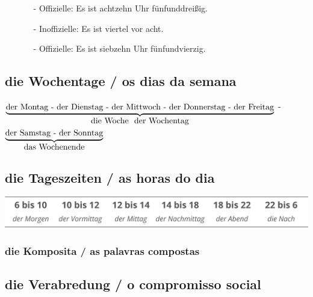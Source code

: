 \begin{multicols}{2}
\begin{itemize}[topsep=0pt,itemsep=4pt,parsep=0pt]
\begin{itemize}
                            \item[-] Offizielle: {\color{saffron}Es ist achtzehn Uhr fünfunddreißig.}
                        \end{itemize}
                    \item[] {\color{deep_carmine}}
                        \begin{itemize}
                            \item[-] Inoffizielle: {\color{deep_carmine}Es ist  viertel vor acht.}
                            \item[-] Offizielle: {\color{deep_carmine}Es ist siebzehn Uhr fünfundvierzig.}
                        \end{itemize}
                \end{itemize}
            \vfill\null
            \end{multicols}

        \subsection{die Wochentage / os dias da semana}\label{subsection:deutsch:die_wochentage}

            $\underbrace{\text{der Montag - der Dienstag - der Mittwoch - der Donnerstag - der Freitag}}_{\text{\normalsize die Woche \ der Wochentag}}$ - $\underbrace{\text{der Samstag - der Sonntag}}_{\text{\normalsize das Wochenende}}$

        \subsection{die Tageszeiten / as horas do dia}\label{subsection:deutsch:die_tageszeiten}

            \includegraphics[width=1\linewidth]{figures/tageszeiten.pdf}

            \subsubsection{die Komposita / as palavras compostas}\label{subsubsection:deutsch:die_komposita}

        \subsection{die Verabredung / o compromisso social}\label{subsection:deutsch:die_verabredung}

